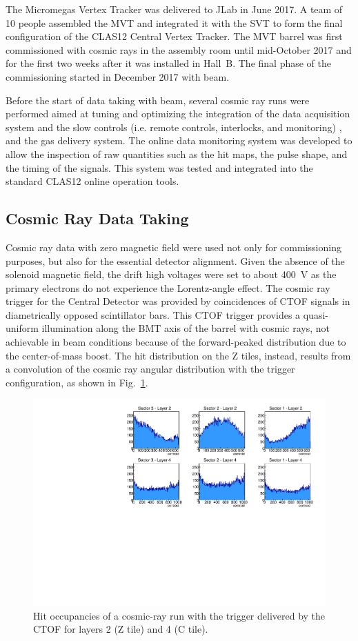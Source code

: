 The Micromegas Vertex Tracker was delivered to JLab in June 2017. A team of 10 people assembled the MVT and
integrated it with the SVT to form the final configuration of the CLAS12 Central Vertex Tracker. The MVT barrel was
first commissioned with cosmic rays in the assembly room until mid-October 2017 and for the first two weeks after it
was installed in Hall~B. The final phase of the commissioning started in December 2017 with beam.

Before the start of data taking with beam, several cosmic ray runs were performed aimed at tuning and optimizing the
integration of the data acquisition system and the slow controls (i.e. remote controls, interlocks, and monitoring)
\cite{daq-nim}, and the gas delivery system. The online data monitoring system was developed to allow the inspection of
raw quantities such as the hit maps, the pulse shape, and the timing of the signals. This system was tested and integrated
into the standard CLAS12 online operation tools. 

\subsection{Cosmic Ray Data Taking}
\label{sec:cosmics}

Cosmic ray data with zero magnetic field were used not only for commissioning purposes, but also for the essential
detector alignment. Given the absence of the solenoid magnetic field, the drift high voltages were set to about 400~V
as the primary electrons do not experience the Lorentz-angle effect. The cosmic ray trigger for the Central Detector
was provided by coincidences of CTOF signals in diametrically opposed scintillator bars. This CTOF trigger provides a
quasi-uniform illumination along the BMT axis of the barrel with cosmic rays, not achievable in beam conditions because
of the forward-peaked distribution due to the center-of-mass boost. The hit distribution on the Z tiles, instead, results
from a convolution of the cosmic ray angular distribution with the trigger configuration, as shown in
Fig.~\ref{fig:mm-cosmic_occupancy}.

\begin{figure}[htb]
 \includegraphics[width=.45\textwidth]{images/BMT_hit_cosmics_CTOFtrigger.pdf}
 \caption{Hit occupancies of a cosmic-ray run with the trigger delivered by the CTOF for layers 2 (Z tile) and 4 (C tile).}
 \label{fig:mm-cosmic_occupancy}
\end{figure}

